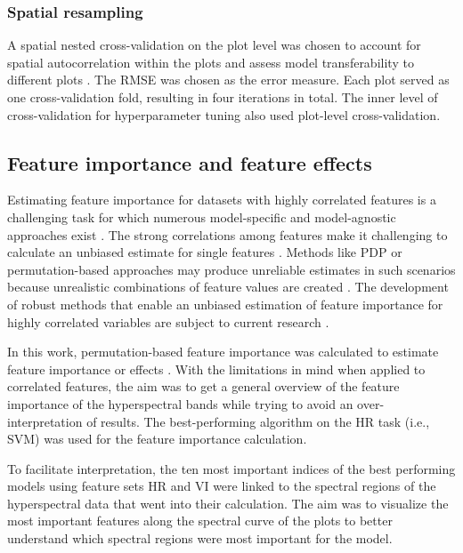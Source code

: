 \documentclass[remotesensing,article,submit,moreauthors,pdftex]{Definitions/mdpi}
\begin{document}
\subsubsection{Spatial resampling}

A spatial nested cross-validation on the plot level was chosen to account for spatial autocorrelation within the plots and assess model transferability to different plots \cite{schratz2019, sperrorest}.
The \ac{RMSE} was chosen as the error measure.
Each plot served as one cross-validation fold, resulting in four iterations in total.
The inner level of cross-validation for hyperparameter tuning also used plot-level cross-validation.

\subsection{Feature importance and feature effects}

Estimating feature importance for datasets with highly correlated features is a challenging task for which numerous model-specific and model-agnostic approaches exist \cite{friedman2001, hastie2001, greenwell2018}.
The strong correlations among features make it challenging to calculate an unbiased estimate for single features \cite{molnar2019}.
Methods like \ac{PDP} or permutation-based approaches may produce unreliable estimates in such scenarios because unrealistic combinations of feature values are created \cite{molnar2019}.
The development of robust methods that enable an unbiased estimation of feature importance for highly correlated variables are subject to current research \cite{brenning2021}.

In this work, permutation-based feature importance was calculated to estimate feature importance or effects \cite{apley2019}.
With the limitations in mind when applied to correlated features, the aim was to get a general overview of the feature importance of the hyperspectral bands while trying to avoid an over-interpretation of results.
The best-performing algorithm on the HR task (i.e., SVM) was used for the feature importance calculation.


To facilitate interpretation, the ten most important indices of the best performing models using feature sets HR and VI were linked to the spectral regions of the hyperspectral data that went into their calculation.
The aim was to visualize the most important features along the spectral curve of the plots to better understand which spectral regions were most important for the model.
\end{document}
